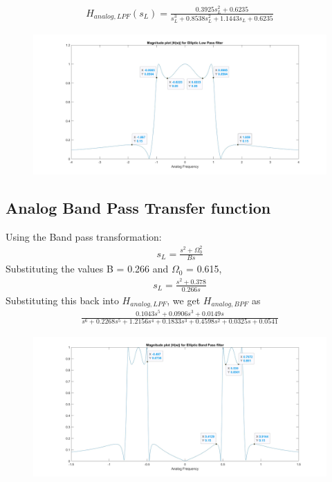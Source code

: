 \documentclass[12pt]{article}
\begin{document}
\begin{gather*}
	H_{analog,LPF}(s_{L}) = \frac{0.3925s_L^2 + 0.6235}{s_L^3 + 0.8538s_L^2 + 1.1443s_L + 0.6235}	
\end{gather*}

\begin{figure}[H]
	\centering
	\includegraphics[width = 18cm]{Filter3ALPF.jpg}
\end{figure}

\color{cyan}
\subsection{Analog Band Pass Transfer function}
\color{black}

Using the Band pass transformation:
\begin{gather*}
	s_L = \frac{s^2 + \Omega_0^2}{Bs}
\end{gather*}
Substituting the values B = 0.266 and $\Omega_0$ = 0.615,
\begin{gather*}
	s_L = \frac{s^2 + 0.378}{0.266s}
\end{gather*}
Substituting this back into $H_{analog,LPF}$, we get $H_{analog,BPF}$ as
\begin{gather*}
	\frac{0.1043s^5 +0.0906s^3 + 0.0149s}{s^6 + 0.2268s^5 + 1.2156s^4 + 0.1833s^3 + 0.4598s^2 + 0.0325s + 0.0541}	
\end{gather*}
\begin{figure}[H]
	\centering
	\includegraphics[width = 18cm, trim=1cm 0cm 1cm 0cm, clip]{Filter3ABPF.jpg}
\end{figure}
\end{document}
